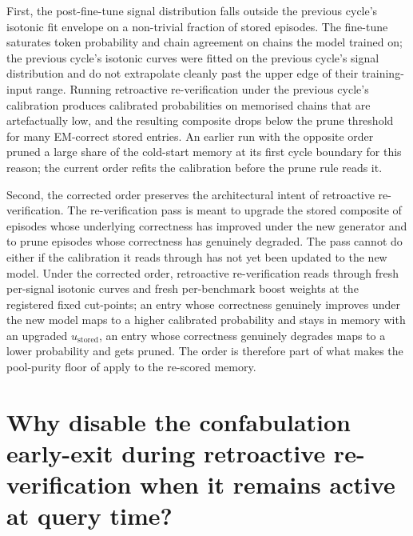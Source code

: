 First, the post-fine-tune signal distribution falls outside the previous cycle's isotonic fit envelope on a non-trivial fraction of stored episodes. The fine-tune saturates token probability and chain agreement on chains the model trained on; the previous cycle's isotonic curves were fitted on the previous cycle's signal distribution and do not extrapolate cleanly past the upper edge of their training-input range. Running retroactive re-verification under the previous cycle's calibration produces calibrated probabilities on memorised chains that are artefactually low, and the resulting composite drops below the prune threshold for many EM-correct stored entries. An earlier run with the opposite order pruned a large share of the cold-start memory at its first cycle boundary for this reason; the current order refits the calibration before the prune rule reads it.

Second, the corrected order preserves the architectural intent of retroactive re-verification. The re-verification pass is meant to upgrade the stored composite of episodes whose underlying correctness has improved under the new generator and to prune episodes whose correctness has genuinely degraded. The pass cannot do either if the calibration it reads through has not yet been updated to the new model. Under the corrected order, retroactive re-verification reads through fresh per-signal isotonic curves and fresh per-benchmark boost weights at the registered fixed cut-points; an entry whose correctness genuinely improves under the new model maps to a higher calibrated probability and stays in memory with an upgraded $u_{\text{stored}}$, an entry whose correctness genuinely degrades maps to a lower probability and gets pruned. The order is therefore part of what makes the pool-purity floor of  apply to the re-scored memory.


\section[Early-exit disabled at retro-verify]{Why disable the confabulation early-exit during retroactive re-verification when it remains active at query time?}
\label{app:qa-early-exit-retro}

